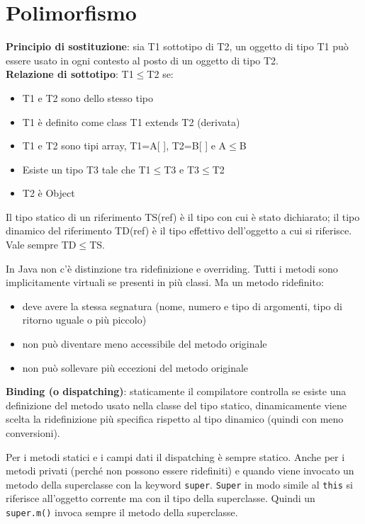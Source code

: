 \section{Polimorfismo} %

\textbf{Principio di sostituzione}: sia T1 sottotipo di T2, un oggetto di tipo T1 può essere usato in ogni contesto al posto di un oggetto di tipo T2. \\
\textbf{Relazione di sottotipo}: T1$\le$T2 se:
\begin{itemize}
\item T1 e T2 sono dello stesso tipo
\item T1 è definito come class T1 extends T2 (derivata)
\item T1 e T2 sono tipi array, T1=A[ ], T2=B[ ] e A$\le$B
\item Esiste un tipo T3 tale che T1$\le$T3 e T3$\le$T2
\item T2 è Object
\end{itemize}

Il tipo statico di un riferimento TS(ref) è il tipo con cui è stato dichiarato; il tipo dinamico del riferimento TD(ref) è il tipo effettivo dell'oggetto a cui si riferisce. Vale sempre TD$\le$TS.

In Java non c'è distinzione tra ridefinizione e overriding. Tutti i metodi sono implicitamente virtuali se presenti in più classi. Ma un metodo ridefinito:
\begin{itemize}
\item deve avere la stessa segnatura (nome, numero e tipo di argomenti, tipo di ritorno uguale o più piccolo)
\item non può diventare meno accessibile del metodo originale
\item non può sollevare più eccezioni del metodo originale
\end{itemize}
\textbf{Binding (o dispatching)}: staticamente il compilatore controlla se esiste una definizione del metodo usato nella classe del tipo statico, dinamicamente viene scelta la ridefinizione più specifica rispetto al tipo dinamico (quindi con meno conversioni).

Per i metodi statici e i campi dati il dispatching è sempre statico. Anche per i metodi privati (perché non possono essere ridefiniti) e quando viene invocato un metodo della superclasse con la keyword \texttt{super}. \texttt{Super} in modo simile al \texttt{this} si riferisce all'oggetto corrente ma con il tipo della superclasse. Quindi un \texttt{super.m()} invoca sempre il metodo della superclasse.

